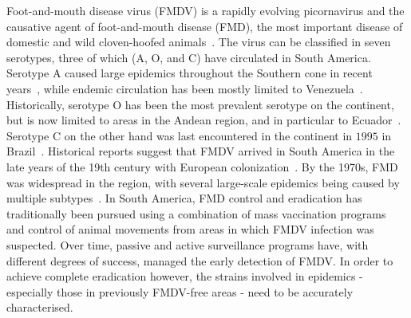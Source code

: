 \documentclass[10pt]{article}
\begin{document}
Foot-and-mouth disease virus (FMDV) is a rapidly evolving picornavirus and the causative agent of foot-and-mouth disease (FMD), the most important disease of domestic and wild cloven-hoofed animals~\citep{Grubman2004}.
The virus can be classified in seven serotypes, three of which (A, O, and C) have circulated in South America.
Serotype A caused large epidemics throughout the Southern cone in recent years~\citep{Perez2001, Malirat2012}, while endemic circulation has been mostly limited to Venezuela~\citep{Malirat2012}.
Historically, serotype O has been the most prevalent serotype on the continent, but is now limited to areas in the Andean region, and in particular to Ecuador~\citep{Malirat2011a}.
Serotype C on the other hand was last encountered in the continent in $1995$ in Brazil~\citep{Correa2002}.
Historical reports suggest that FMDV arrived in South America in the late years of the 19th century with European colonization~\citep{Naranjo2013, Tully2008}. 
By the 1970s, FMD was widespread in the region, with several large-scale epidemics being caused by multiple subtypes~\citep{Saraiva2003}.
In South America, FMD control and eradication has traditionally been pursued using a combination of mass vaccination programs~\citep{Saraiva2004b} and control of animal movements from areas in which FMDV infection was suspected.
Over time, passive and active surveillance programs have, with different degrees of success, managed the early detection of FMDV.
In order to achieve complete eradication however, the strains involved in epidemics - especially those in previously FMDV-free areas - need to be accurately characterised.
\end{document}
